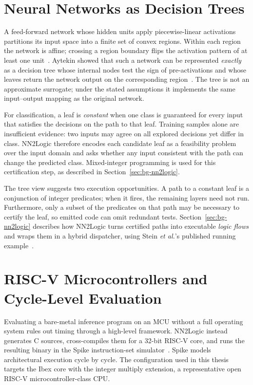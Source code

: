 \section{Neural Networks as Decision Trees}
\label{sec:bg-trees}

A feed-forward network whose hidden units apply piecewise-linear activations partitions its input space into a finite set of convex regions.
Within each region the network is affine; crossing a region boundary flips the activation pattern of at least one unit~\cite{aytekin2022nns}.
Aytekin showed that such a network can be represented \emph{exactly} as a decision tree whose internal nodes test the sign of pre-activations and whose leaves return the network output on the corresponding region~\cite{aytekin2022nns}.
The tree is not an approximate surrogate; under the stated assumptions it implements the same input--output mapping as the original network.

For classification, a leaf is \emph{constant} when one class is guaranteed for every input that satisfies the decisions on the path to that leaf.
Training samples alone are insufficient evidence: two inputs may agree on all explored decisions yet differ in class.
NN2Logic therefore encodes each candidate leaf as a feasibility problem over the input domain and asks whether any input consistent with the path can change the predicted class.
Mixed-integer programming is used for this certification step, as described in Section~\ref{sec:bg-nn2logic}.

The tree view suggests two execution opportunities.
A path to a constant leaf is a conjunction of integer predicates; when it fires, the remaining layers need not run.
Furthermore, only a subset of the predicates on that path may be necessary to certify the leaf, so emitted code can omit redundant tests.
Section~\ref{sec:bg-nn2logic} describes how NN2Logic turns certified paths into executable \emph{logic flows} and wraps them in a hybrid dispatcher, using Stein \textit{et al.}'s published running example~\cite{stein2026nn2logic}.


\section{RISC-V Microcontrollers and Cycle-Level Evaluation}
\label{sec:bg-riscv}

Evaluating a bare-metal inference program on an \ac{MCU} without a full operating system rules out timing through a high-level framework.
NN2Logic instead generates C sources, cross-compiles them for a 32-bit \mbox{RISC-V} core, and runs the resulting binary in the Spike instruction-set simulator~\cite{stein2026nn2logic,lowriscibex}.
Spike models architectural execution cycle by cycle.
The configuration used in this thesis targets the Ibex core with the integer multiply extension, a representative open \mbox{RISC-V} microcontroller-class \ac{CPU}.

